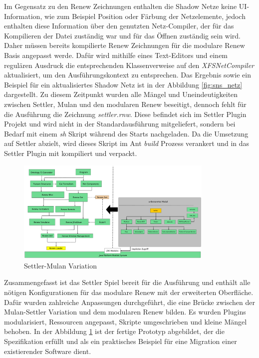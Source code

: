 	Im Gegensatz zu den Renew Zeichnungen enthalten die Shadow Netze keine UI-Information, wie zum Beispiel Position oder Färbung der Netzelemente, jedoch enthalten diese Information über den genutzten Netz-Compiler, der für das Kompilieren der Datei zuständig war und für das Öffnen zuständig sein wird. Daher müssen bereits kompilierte Renew Zeichnungen für die modulare Renew Basis angepasst werde. Dafür wird mithilfe eines Text-Editors und einem regulären Ausdruck die entsprechenden Klassenverweise auf den \textit{XFSNetCompiler} aktualisiert, um den Ausführungskontext zu entsprechen. \newline
	Das Ergebnis sowie ein Beispiel für ein aktualisiertes Shadow Netz ist in der Abbildung \ref{fig:sns_netz} dargestellt. \bigbreak
	Zu diesem Zeitpunkt wurden alle Mängel und Uneindeutigkeiten zwischen Settler, Mulan und den modularen Renew beseitigt, dennoch fehlt für die Ausführung die Zeichnung \textit{settler.rnw}. Diese befindet sich im Settler Plugin Projekt und wird nicht in der Standardausführung mitgeliefert, sondern bei Bedarf mit einem \textit{sh} Skript während des Starts nachgeladen. \newline
	Da die Umsetzung auf Settler abzielt, wird dieses Skript im Ant \textit{build} Prozess verankert und in das Settler Plugin mit kompiliert und verpackt. \newline

	\begin{figure}[h!]
	  \centering
	  \includegraphics[width=0.84\textwidth]{material/images/settler-renew-mulan-vm.pdf}
	  \caption{Settler-Mulan Variation}
	  \label{fig:trans_config}
	\end{figure}

	Zusammengefasst ist das Settler Spiel bereit für die Ausführung und enthält alle nötigen Konfigurationen für das modulare Renew mit der erweiterten Oberfläche. Dafür wurden zahlreiche Anpassungen durchgeführt, die eine Brücke zwischen der Mulan-Settler Variation und dem modularen Renew bilden. Es wurden Plugins modularisiert, Ressourcen angepasst, Skripte umgeschrieben und kleine Mängel behoben. \newline
	In der Abbildung \ref{fig:trans_config} ist der fertige Prototyp abgebildet, der die Spezifikation erfüllt und als ein praktisches Beispiel für eine Migration einer existierender Software dient. 


